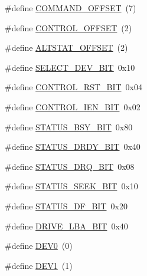 \begin{DoxyCompactItemize}
\item 
\#define \hyperlink{ide__disk_8hh_adb83c033ee492824badb77fa8ebd5c5d}{COMMAND\_\-OFFSET}~(7)
\item 
\#define \hyperlink{ide__disk_8hh_ae15f861f15f995e6655f24ababa373b0}{CONTROL\_\-OFFSET}~(2)
\item 
\#define \hyperlink{ide__disk_8hh_ae0878ccca45f58e9438fd4b05593042b}{ALTSTAT\_\-OFFSET}~(2)
\item 
\#define \hyperlink{ide__disk_8hh_a05842c3a1c122fb3d8cf867fdfda63ab}{SELECT\_\-DEV\_\-BIT}~0x10
\item 
\#define \hyperlink{ide__disk_8hh_a8156819b43430caea117fda9179f6b92}{CONTROL\_\-RST\_\-BIT}~0x04
\item 
\#define \hyperlink{ide__disk_8hh_ae9920e68c1f940e29dee8f47c5b0da54}{CONTROL\_\-IEN\_\-BIT}~0x02
\item 
\#define \hyperlink{ide__disk_8hh_a3d03a0c27c2a175009ae7cb5f1a5b5e1}{STATUS\_\-BSY\_\-BIT}~0x80
\item 
\#define \hyperlink{ide__disk_8hh_ab8255d1245e66901dbf984fcb88b39b2}{STATUS\_\-DRDY\_\-BIT}~0x40
\item 
\#define \hyperlink{ide__disk_8hh_a6dc9ea6abc0948e38e3716456d711267}{STATUS\_\-DRQ\_\-BIT}~0x08
\item 
\#define \hyperlink{ide__disk_8hh_a6d24123c25308f8d0b135602dca13b8d}{STATUS\_\-SEEK\_\-BIT}~0x10
\item 
\#define \hyperlink{ide__disk_8hh_a723478546687fa887ff111c2aa99983b}{STATUS\_\-DF\_\-BIT}~0x20
\item 
\#define \hyperlink{ide__disk_8hh_ad88dd68f3f134fbb039bc89e99db0e64}{DRIVE\_\-LBA\_\-BIT}~0x40
\item 
\#define \hyperlink{ide__disk_8hh_a23bd1221f53dd9ccc84c6afd59bde187}{DEV0}~(0)
\item 
\#define \hyperlink{ide__disk_8hh_a5bb415eb7788e538901aa11bbe583094}{DEV1}~(1)
\end{DoxyCompactItemize}
